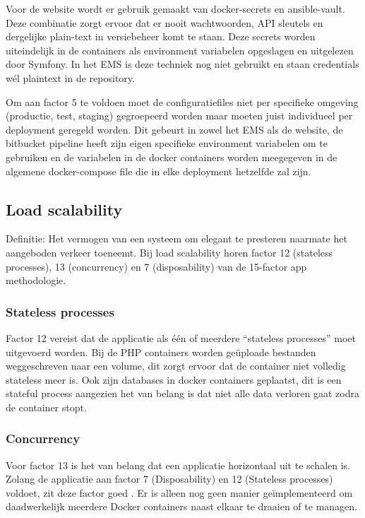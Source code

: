 Voor de website wordt er gebruik gemaakt van docker-secrets en ansible-vault. Deze combinatie zorgt ervoor dat er nooit wachtwoorden, API sleutels en dergelijke plain-text in versiebeheer komt te staan. Deze secrets worden uiteindelijk in de containers als environment variabelen opgeslagen en uitgelezen door Symfony. In het EMS is deze techniek nog niet gebruikt en staan credentials wél plaintext in de repository.

Om aan factor 5 te voldoen moet de configuratiefiles niet per specifieke omgeving (productie, test, staging) gegroepeerd worden maar moeten juist individueel per deployment geregeld worden. Dit gebeurt in zowel het EMS als de website, de bitbucket pipeline heeft zijn eigen specifieke environment variabelen om te gebruiken en de variabelen in de docker containers worden meegegeven in de algemene docker-compose file die in elke deployment hetzelfde zal zijn.

\subsection{Load scalability}
Definitie: Het vermogen van een systeem om elegant te presteren naarmate het aangeboden verkeer toeneemt. Bij load scalability horen factor 12 (stateless processes), 13 (concurrency) en 7 (disposability) van de 15-factor app methodologie. 

\subsubsection{Stateless processes}
Factor 12 vereist dat de applicatie als één of meerdere \enquote{stateless processes} moet uitgevoerd worden. Bij de PHP containers worden geüploade bestanden weggeschreven naar een volume, dit zorgt ervoor dat de container niet volledig stateless meer is. Ook zijn databases in docker containers geplaatst, dit is een stateful process aangezien het van belang is dat niet alle data verloren gaat zodra de container stopt.

\subsubsection{Concurrency}
Voor factor 13 is het van belang dat een applicatie horizontaal uit te schalen is. Zolang de applicatie aan factor 7 (Disposability) en 12 (Stateless processes) voldoet, zit deze factor goed \parencite{Beyond12Factor}. Er is alleen nog geen manier geïmplementeerd om daadwerkelijk meerdere Docker containers naast elkaar te draaien of te managen.

